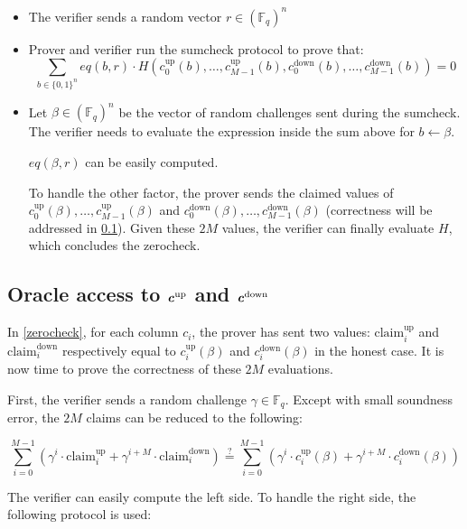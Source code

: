 \documentclass{article}
\newcommand{\Fq}{\mathbb F_q}
\begin{document}
\begin{itemize}
    \item The verifier sends a random vector $r \in (\Fq)^n$
    \item Prover and verifier run the sumcheck protocol to prove that:
    $$ \sum_{b \in \{0, 1\}^n} eq(b, r) \cdot H(c_0^{\text{up}}(b), \dots, c_{M-1}^{\text{up}}(b), c_0^{\text{down}}(b), \dots, c_{M-1}^{\text{down}}(b)) = 0 $$
    \item Let $\beta \in (\Fq)^n$ be the vector of random challenges sent during the sumcheck. The verifier needs to evaluate the expression inside the sum above for $b \xleftarrow{} \beta$.
    
    $eq(\beta, r)$ can be easily computed.
    
    To handle the other factor, the prover sends the claimed values of $c_0^{\text{up}}(\beta), \dots, c_{M-1}^{\text{up}}(\beta)$ and $c_0^{\text{down}}(\beta), \dots, c_{M-1}^{\text{down}}(\beta)$ (correctness will be addressed in \ref{shifted_mle}). Given these $2M$ values, the verifier can finally evaluate $H$, which concludes the zerocheck.
\end{itemize}

\subsection{Oracle access to \texorpdfstring{$\textbf{\textit{c}}^{\text{up}}$}{} and \texorpdfstring{$\textbf{\textit{c}}^{\text{down}}$}{}}\label{shifted_mle}

In \ref{zerocheck}, for each column $c_i$, the prover has sent two values: $\text{claim}^\text{up}_i$ and $\text{claim}^\text{down}_i$ respectively equal to $c_i^{\text{up}}(\beta)$ and $c_i^{\text{down}}(\beta)$ in the honest case. It is now time to prove the correctness of these $2M$ evaluations.

First, the verifier sends a random challenge $\gamma \in \Fq$. Except with small soundness error, the $2M$ claims can be reduced to the following:

\begin{equation}\label{eq1}
    \sum_{i = 0}^{M-1} (\gamma^i \cdot \text{claim}^\text{up}_i + \gamma^{i+M} \cdot \text{claim}^\text{down}_i) \stackrel{?}{=} \sum_{i = 0}^{M-1} (\gamma^i \cdot c_i^{\text{up}}(\beta) + \gamma^{i+M} \cdot c_i^{\text{down}}(\beta))
\end{equation}


The verifier can easily compute the left side. To handle the right side, the following protocol is used:
\end{document}
